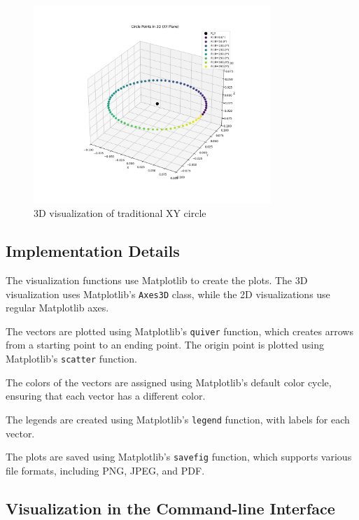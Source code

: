 \begin{figure}[H]
    \centering
    \includegraphics[width=0.8\textwidth]{figures/3d_xy_circle.png}
    \caption{3D visualization of traditional XY circle}
    \label{fig:vis_3d_xy_circle}
\end{figure}

\subsection{Implementation Details}

The visualization functions use Matplotlib to create the plots. The 3D visualization uses Matplotlib's \texttt{Axes3D} class, while the 2D visualizations use regular Matplotlib axes.

The vectors are plotted using Matplotlib's \texttt{quiver} function, which creates arrows from a starting point to an ending point. The origin point is plotted using Matplotlib's \texttt{scatter} function.

The colors of the vectors are assigned using Matplotlib's default color cycle, ensuring that each vector has a different color.

The legends are created using Matplotlib's \texttt{legend} function, with labels for each vector.

The plots are saved using Matplotlib's \texttt{savefig} function, which supports various file formats, including PNG, JPEG, and PDF.

\subsection{Visualization in the Command-line Interface}

